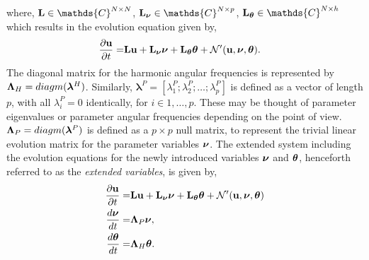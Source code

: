where, $\Lu\in\mathds{C}^{N\times N}$, $\Lnu\in\mathds{C}^{N\times p}$, $\Ltheta\in\mathds{C}^{N\times h}$ which results in the evolution equation given by,  
\begin{align}
	\frac{\partial \mathbf{u}}{\partial t} =&  \mathbf{L}\mathbf{u} + \mathbf{L}_{\boldsymbol{\nu}}\boldsymbol{\nu} + \mathbf{L}_{\boldsymbol{\theta}}\boldsymbol{\theta} + \mathcal{N}'(\mathbf{u},\boldsymbol{\nu},\boldsymbol{\theta})  \nonumber.
\end{align}
The diagonal matrix for the harmonic angular frequencies is represented by $\mathbf{\Lambda}_{H} = diagm(\boldsymbol{\lambda}^{H})$. Similarly, $\boldsymbol{\lambda}^{P} = [\lambda^{P}_{1};\lambda^{P}_{2};\ldots;\lambda^{P}_{p}]$ is defined as a vector of length $p$, with all $\lambda^{P}_{i} = 0$ identically, for $i\in 1,\ldots, p$. These may be thought of parameter eigenvalues or parameter angular frequencies depending on the point of view. $\mathbf{\Lambda}_{P} = diagm(\boldsymbol{\lambda}^{P})$ is defined as a $p\times p$ null matrix, to represent the trivial linear evolution matrix for the parameter variables $\boldsymbol{\nu}$. The extended system including the evolution equations for the newly introduced variables $\boldsymbol{\nu}$ and $\boldsymbol{\theta}$, henceforth referred to as the \emph{extended variables}, is given by,
\begin{subequations}
	\begin{align}
			\label{eqn:evolution_extended1}
			\frac{\partial \mathbf{u}}{\partial t} =& \mathbf{L}\mathbf{u} + \mathbf{L}_{\boldsymbol{\nu}}\boldsymbol{\nu} +\mathbf{L}_{\boldsymbol{\theta}}\boldsymbol{\theta} + \mathcal{N}'(\mathbf{u},\boldsymbol{\nu},\boldsymbol{\theta}) \\
			\label{eqn:evolution_extended2}
			\frac{d \boldsymbol{\nu}}{d t} = & \mathbf{\Lambda}_{P}\boldsymbol{\nu}, \\
			\label{eqn:evolution_extended3}
			\frac{d \boldsymbol{\theta}}{d t} = &  \mathbf{\Lambda}_{H}\boldsymbol{\theta}. 
	\end{align}
	\label{eqn:evolution_extended}
\end{subequations}

